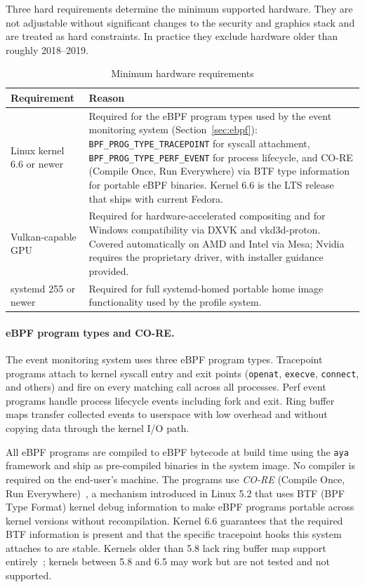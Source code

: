 Three hard requirements determine the minimum supported hardware. They are not
adjustable without significant changes to the security and graphics stack and
are treated as hard constraints. In practice they exclude hardware older than
roughly 2018--2019.

\begin{table}[htbp]
\caption{Minimum hardware requirements}
\label{tab:hardware}
\begin{tabularx}{\linewidth}{lX}
\toprule
\textbf{Requirement} & \textbf{Reason} \\
\midrule
Linux kernel 6.6 or newer &
  Required for the eBPF program types used by the event monitoring system
  (Section~\ref{sec:ebpf}): \texttt{BPF\_PROG\_TYPE\_TRACEPOINT} for syscall
  attachment, \texttt{BPF\_PROG\_TYPE\_PERF\_EVENT} for process lifecycle,
  and CO-RE (Compile Once, Run Everywhere) via BTF type information for
  portable eBPF binaries. Kernel 6.6 is the LTS release that ships with
  current Fedora. \\
Vulkan-capable GPU &
  Required for hardware-accelerated compositing and for Windows compatibility
  via DXVK and vkd3d-proton. Covered automatically on AMD and Intel via Mesa;
  Nvidia requires the proprietary driver, with installer guidance provided. \\
systemd 255 or newer &
  Required for full systemd-homed portable home image functionality used by
  the profile system. \\
\bottomrule
\end{tabularx}
\end{table}

\paragraph{eBPF program types and CO-RE.}
The event monitoring system uses three eBPF program types. Tracepoint programs
attach to kernel syscall entry and exit points (\texttt{openat},
\texttt{execve}, \texttt{connect}, and others) and fire on every matching
call across all processes. Perf event programs handle process lifecycle events
including fork and exit. Ring buffer maps transfer collected events to
userspace with low overhead and without copying data through the kernel I/O
path.

All eBPF programs are compiled to eBPF bytecode at build time using the
\texttt{aya}~\cite{aya} framework and ship as pre-compiled binaries in the
system image. No compiler is required on the end-user's machine. The programs
use \emph{CO-RE} (Compile Once, Run Everywhere)~\cite{ebpf:core}, a mechanism
introduced in Linux 5.2 that uses BTF (BPF Type Format) kernel debug
information to make eBPF programs portable across kernel versions without
recompilation. Kernel 6.6 guarantees that the required BTF information is
present and that the specific tracepoint hooks this system attaches to are
stable. Kernels older than 5.8 lack ring buffer map support
entirely~\cite{ebpf:ringbuf}; kernels between 5.8 and 6.5 may work but are
not tested and not supported.

